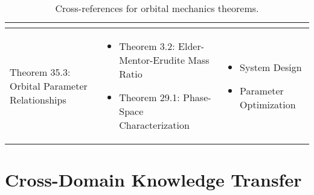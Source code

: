 \begin{table}[h]
\begin{tabular}{|l|p{7cm}|p{4cm}|}
\begin{itemize}
\end{itemize} \\
\hline
Theorem 35.3: Orbital Parameter Relationships &
\begin{itemize}
    \item Theorem 3.2: Elder-Mentor-Erudite Mass Ratio
    \item Theorem 29.1: Phase-Space Characterization
\end{itemize} &
\begin{itemize}
    \item System Design
    \item Parameter Optimization
\end{itemize} \\
\hline
\end{tabular}
\caption{Cross-references for orbital mechanics theorems.}
\label{tab:xref_orbital}
\end{table}

\section{Cross-Domain Knowledge Transfer}

